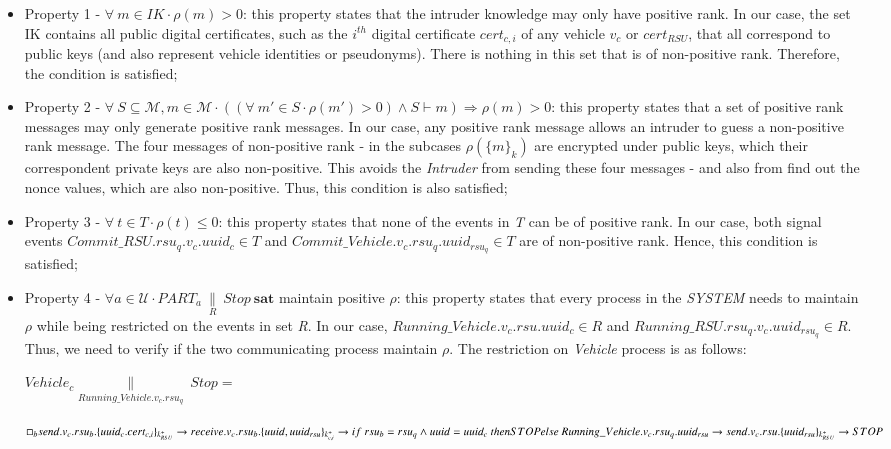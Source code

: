 \documentclass[preprint,12pt]{elsarticle}
\begin{document}
\begin{itemize}
	\item Property 1 - $\forall~m \in IK \cdot \rho(m) > 0$: this property states that the intruder knowledge may only have positive rank. In our case, the set IK contains all public digital certificates, such as the $i^{th}$ digital certificate $cert_{c, i}$ of any vehicle $v_c$ or $cert_{RSU}$, that all correspond to public keys (and also represent vehicle identities or pseudonyms). There is nothing in this set that is of non-positive rank. Therefore, the condition is satisfied;
	
	\item Property 2 -  $\forall~S \subseteq \mathcal{M}, m \in \mathcal{M} \cdot ( (\forall~m' \in S \cdot \rho(m') > 0) \wedge S \vdash m) \Rightarrow \rho(m) > 0$: this property states that a set of positive rank messages may only  generate positive rank messages. In our case, any positive rank message allows an intruder to guess a non-positive rank message. The four messages of non-positive rank - in the subcases $\rho(\{m\}_k)$ are encrypted under public keys, which their correspondent private keys are also non-positive. This avoids the \textit{Intruder} from sending these four messages - and also from find out the nonce values, which are also non-positive. Thus, this condition is also satisfied;
	
	\item Property 3 - $\forall~t \in T \cdot \rho(t) \leq 0$: this property states that none of the events in \textit{T} can be of positive rank. In our case, both signal events $Commit\_RSU.rsu_q.v_c.uuid_{c} \in T$ and $Commit\_Vehicle.v_c.rsu_q.uuid_{rsu_q} \in T$ are of non-positive rank. Hence, this condition is satisfied;
	
	\item Property 4 - $\forall a \in \mathcal{U} \cdot PART_{a}~\underset{R}{\|}~\textit{Stop}~\textbf{sat}$ maintain positive $\rho$: this property states that every process in the \textit{SYSTEM} needs to maintain $\rho$ while being restricted on the events in set \textit{R}. In our case, $Running\_Vehicle.v_c.rsu.uuid_c \in R$ and $Running\_RSU.rsu_q.v_c.uuid_{rsu_q} \in R$. Thus, we need to verify if the two communicating process maintain $\rho$. The restriction on \textit{Vehicle} process is as follows:
	
	
	$Vehicle_{c} \underset{Running\_Vehicle.v_{c}.rsu_{q}}{\|}~\textit{Stop} = $ \parbox[t]{.6\textwidth}{$\Box_{b} \\
	send.v_{c}.rsu_{b}.\{uuid_c.cert_{c,i}\}_{k^{+}_{RSU}} \rightarrow \\
	receive.v_{c}.rsu_{b}.\{uuid, uuid_{rsu}\}_{k^{+}_{c, i}} \rightarrow \\
	if~rsu_b = rsu_q \wedge uuid = uuid_c~then\\
	STOP \\
	else~Running\_Vehicle.v_{c}.rsu_q.uuid_{rsu} \rightarrow \\
	send.v_{c}.rsu.\{uuid_{rsu}\}_{k^{+}_{RSU}} \rightarrow STOP$} \\
		

\end{itemize}
\end{document}
